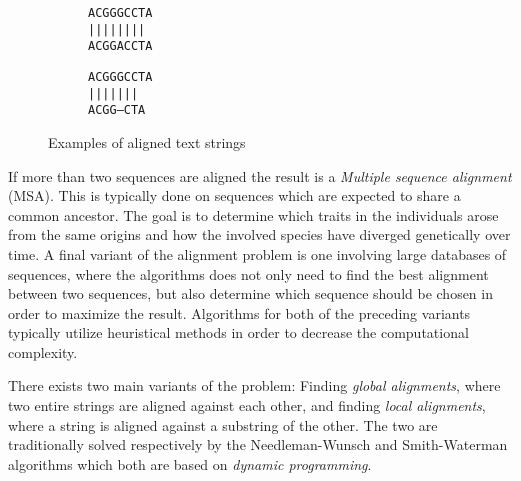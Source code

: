 \documentclass[thesis.tex]{subfiles}
\begin{document}
\begin{wrapfigure}[15]{l}{0.3\textwidth}
  \begin{mdframed}
    \begin{subfigure}[t]{\textwidth}
      \begin{mdframed}
        \begin{center}
          \texttt{ACGGGCCTA}\\
          \texttt{||||\space||||}\\
          \texttt{ACGGACCTA}
        \end{center}
      \end{mdframed}
      \captionsetup{skip=-8pt}
    \end{subfigure}
    \begin{subfigure}[b]{\textwidth}
      \begin{mdframed}
        \begin{center}
          \texttt{ACGGGCCTA}\\
          \texttt{||||\space\space|||}\\
          \texttt{ACGG---CTA}
        \end{center}
      \end{mdframed}
      \captionsetup{skip=-8pt}
    \end{subfigure}
  \end{mdframed}
  \vspace*{-5mm}
  \caption[Examples of aligned text strings]{Examples of aligned text strings}
  \label{fig:alignments}
\end{wrapfigure}
If more than two sequences are aligned the result is a \textit{Multiple sequence alignment} (MSA). This is typically done on sequences which are expected to share a common ancestor. The goal is to determine which traits in the individuals arose from the same origins and how the involved species have diverged genetically over time. A final variant of the alignment problem is one involving large databases of sequences, where the algorithms does not only need to find the best alignment between two sequences, but also determine which sequence should be chosen in order to maximize the result. Algorithms for both of the preceding variants typically utilize heuristical methods in order to decrease the computational complexity.\\
\par\noindent
There exists two main variants of the problem: Finding \textit{global alignments}, where two entire strings are aligned against each other, and finding \textit{local alignments}, where a string is aligned against a substring of the other. The two are traditionally solved respectively by the Needleman-Wunsch and Smith-Waterman algorithms which both are based on \textit{dynamic programming}.
\end{document}
